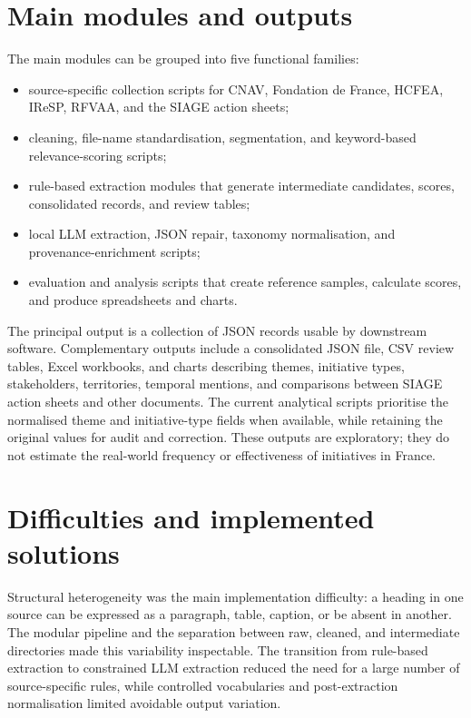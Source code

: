 \documentclass[
11pt,
english,
singlespacing,
headsepline,
]{MastersDoctoralThesis}
\begin{document}
\section{Main modules and outputs}

The main modules can be grouped into five functional families:

\begin{itemize}
    \item source-specific collection scripts for CNAV, Fondation de France,
    HCFEA, IReSP, RFVAA, and the SIAGE action sheets;
    \item cleaning, file-name standardisation, segmentation, and
    keyword-based relevance-scoring scripts;
    \item rule-based extraction modules that generate intermediate candidates,
    scores, consolidated records, and review tables;
    \item local LLM extraction, JSON repair, taxonomy normalisation, and
    provenance-enrichment scripts;
    \item evaluation and analysis scripts that create reference samples,
    calculate scores, and produce spreadsheets and charts.
\end{itemize}

The principal output is a collection of JSON records usable by downstream
software. Complementary outputs include a consolidated JSON file, CSV review
tables, Excel workbooks, and charts describing themes, initiative types,
stakeholders, territories, temporal mentions, and comparisons between SIAGE
action sheets and other documents. The current analytical scripts prioritise
the normalised theme and initiative-type fields when available, while retaining
the original values for audit and correction. These outputs are exploratory;
they do not estimate the real-world frequency or effectiveness of initiatives
in France.

\section{Difficulties and implemented solutions}

Structural heterogeneity was the main implementation difficulty: a heading in
one source can be expressed as a paragraph, table, caption, or be absent in
another. The modular pipeline and the separation between raw, cleaned, and
intermediate directories made this variability inspectable. The transition from
rule-based extraction to constrained LLM extraction reduced the need for a
large number of source-specific rules, while controlled vocabularies and
post-extraction normalisation limited avoidable output variation.
\end{document}

